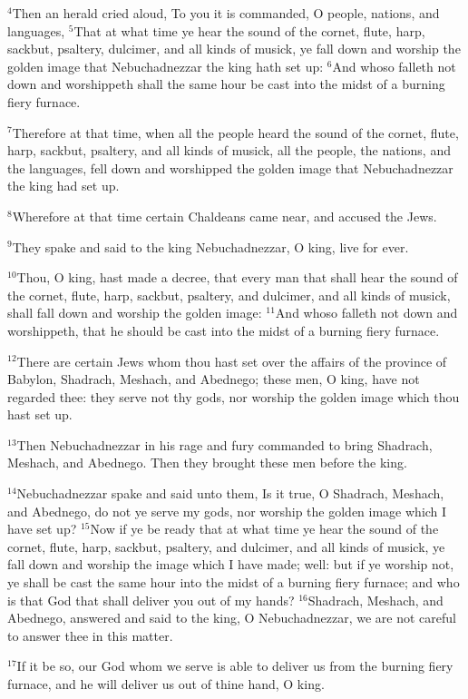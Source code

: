 \documentclass[12pt]{article}
\begin{document}
$^{4}$Then an herald cried aloud, To you it is commanded, O people,
nations, and languages, $^{5}$That at what time ye hear the sound of the
cornet, flute, harp, sackbut, psaltery, dulcimer, and all kinds of
musick, ye fall down and worship the golden image that Nebuchadnezzar
the king hath set up: $^{6}$And whoso falleth not down and worshippeth
shall the same hour be cast into the midst of a burning fiery furnace.


$^{7}$Therefore at that time, when all the people heard the sound of the
cornet, flute, harp, sackbut, psaltery, and all kinds of musick, all
the people, the nations, and the languages, fell down and worshipped
the golden image that Nebuchadnezzar the king had set up.


$^{8}$Wherefore at that time certain Chaldeans came near, and accused
the Jews.


$^{9}$They spake and said to the king Nebuchadnezzar, O king, live for
ever.


$^{10}$Thou, O king, hast made a decree, that every man that shall hear
the sound of the cornet, flute, harp, sackbut, psaltery, and dulcimer,
and all kinds of musick, shall fall down and worship the golden image:
$^{11}$And whoso falleth not down and worshippeth, that he should be
cast into the midst of a burning fiery furnace.


$^{12}$There are certain Jews whom thou hast set over the affairs of the
province of Babylon, Shadrach, Meshach, and Abednego; these men, O
king, have not regarded thee: they serve not thy gods, nor worship the
golden image which thou hast set up.


$^{13}$Then Nebuchadnezzar in his rage and fury commanded to bring
Shadrach, Meshach, and Abednego. Then they brought these men before
the king.


$^{14}$Nebuchadnezzar spake and said unto them, Is it true, O Shadrach,
Meshach, and Abednego, do not ye serve my gods, nor worship the golden
image which I have set up?  $^{15}$Now if ye be ready that at what time
ye hear the sound of the cornet, flute, harp, sackbut, psaltery, and
dulcimer, and all kinds of musick, ye fall down and worship the image
which I have made; well: but if ye worship not, ye shall be cast the
same hour into the midst of a burning fiery furnace; and who is that
God that shall deliver you out of my hands?  $^{16}$Shadrach, Meshach,
and Abednego, answered and said to the king, O Nebuchadnezzar, we are
not careful to answer thee in this matter.


$^{17}$If it be so, our God whom we serve is able to deliver us from the
burning fiery furnace, and he will deliver us out of thine hand, O
king.
\end{document}
